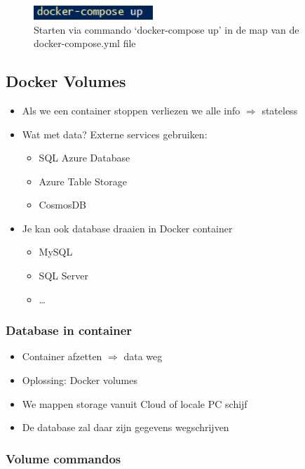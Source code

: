 \documentclass{article}
\begin{document}
\begin{figure}[H]
    \centering
    \includegraphics[width=0.4\textwidth]{docker-compose-3.png}
    \caption{Starten via commando `docker-compose up' in de map van de docker-compose.yml file}
\end{figure}

\subsection{Docker Volumes}

\begin{itemize}
    \item Als we een container stoppen verliezen we alle info $\Rightarrow$ stateless
    \item Wat met data? Externe services gebruiken:
    \begin{itemize}
        \item SQL Azure Database
        \item Azure Table Storage
        \item CosmosDB
    \end{itemize}
    \item Je kan ook database draaien in Docker container
    \begin{itemize}
        \item MySQL
        \item SQL Server
        \item \dots
    \end{itemize}
\end{itemize}

\subsubsection{Database in container}

\begin{itemize}
    \item Container afzetten $\Rightarrow$ data weg
    \item Oplossing: Docker volumes
    \item We mappen storage vanuit Cloud of locale PC schijf
    \item De database zal daar zijn gegevens wegschrijven
\end{itemize}

\subsubsection{Volume commandos}
\end{document}
